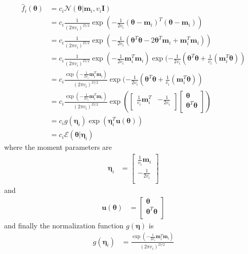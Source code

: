 \documentclass[a4]{article}
\begin{document}
\begin{equation}
\begin{aligned}
\hat{f}_i(\bm{\theta})
&= c_i \mathcal{N}(\bm{\theta}| \bm{m}_i, v_i\bm{I})\\
&= c_i \frac{1}{(2\pi v_i)^{D/2}}\exp(-\frac{1}{2v_i}(\bm{\theta}-\bm{m}_i)^T(\bm{\theta}-\bm{m}_i))\\
&= c_i \frac{1}{(2\pi v_i)^{D/2}}\exp(-\frac{1}{2v_i}(
    \bm{\theta}^T\bm{\theta} - 2 \bm{\theta}^T\bm{m}_i + \bm{m}_i^T\bm{m}_i)
)\\
&= c_i \frac{1}{(2\pi v_i)^{D/2}}
\exp(-\frac{1}{2v_i}\bm{m}_i^T\bm{m}_i)
\exp(-\frac{1}{2v_i}(\bm{\theta}^T\bm{\theta} 
     + \frac{1}{v_i}(\bm{m}_i^T\bm{\theta})
    )\\
&= c_i \frac{\exp(-\frac{1}{2v_i}\bm{m}_i^T\bm{m}_i)}{(2\pi v_i)^{D/2}}
\exp(-\frac{1}{2v_i}(\bm{\theta}^T\bm{\theta} + \frac{1}{v_i}(\bm{m}_i^T\bm{\theta}) )\\
&= c_i \frac{\exp(-\frac{1}{2v_i}\bm{m}_i^T\bm{m}_i)}{(2\pi v_i)^{D/2}}
\exp(
\begin{bmatrix}
\frac{1}{v_i}\bm{m}_i^T & -\frac{1}{2v_i}\\
\end{bmatrix}
\begin{bmatrix}
\bm{\theta}\\
\bm{\theta}^T\bm{\theta}\\
\end{bmatrix}
)\\
&= c_ig(\bm{\eta}_i)\exp(\bm{\eta}_i^T\bm{u}(\bm{\theta}))\\
&= c_i\mathcal{E}(\bm{\theta}|\bm{\eta}_i)
\end{aligned}
\end{equation}
where the moment parameters are
\begin{equation}
\begin{aligned}
\bm{\eta}_i &= 
\begin{bmatrix}
\frac{1}{v_i}\bm{m}_i\\
-\frac{1}{2v_i}\\
\end{bmatrix}
\end{aligned}
\end{equation}
and
\begin{equation}
\begin{aligned}
\bm{u}(\bm{\theta}) &= 
\begin{bmatrix}
\bm{\theta}\\
\bm{\theta}^T\bm{\theta}\\
\end{bmatrix}
\end{aligned}
\end{equation}
and finally the normalization function $g(\bm{\eta})$ is
\begin{equation}
\begin{aligned}
g(\bm{\eta}_i) &= \frac{\exp(-\frac{1}{2v_i}\bm{m}_i^T\bm{m}_i)}{(2\pi v_i)^{D/2}}
\end{aligned}
\end{equation}
\end{document}
